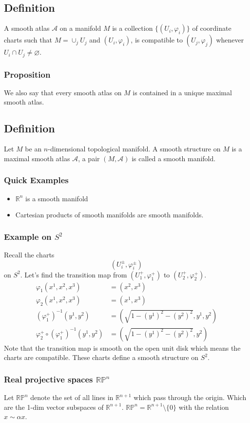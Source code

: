 \documentclass[a4paper]{article}
\begin{document}
\subsection*{Definition} A smooth atlas $\mathcal{A}$ on a manifold $M$ is a collection $\{(U_i, \varphi_i)\}$ of coordinate charts such that $M = \cup_j U_j$ and $(U_i, \varphi_i)$, is compatible to $(U_j, \varphi_j)$ whenever $U_i \cap U_j \neq \varnothing$. 
\subsubsection*{Proposition}
We also say that every smooth atlas on $M$ is contained in a unique maximal smooth atlas. 

\subsection*{Definition} Let $M$ be an $n$-dimensional topological manifold. A smooth structure on $M$ is a maximal smooth atlas $\mathcal{A}$, a pair $(M, \mathcal{A})$ is called a smooth manifold.
 
\subsubsection*{Quick Examples}
\begin{itemize}
    \item $\mathds{R}^n$ is a smooth manifold
    \item Cartesian products of smooth manifolds are smooth manifolds.
\end{itemize}

\subsubsection*{Example on $S^2$}
Recall the charts
\[
    (U_i^\pm, \varphi_i^\pm)
\]
on $S^2$. Let's find the transition map from $(U_1^+, \varphi_1^+)$ to $(U_2^+, \varphi_2^+)$.
\[
    \begin{aligned}
        \varphi_1(x^1,x^2,x^3) &= (x^2, x^3) \\
        \varphi_2(x^1,x^2,x^3) &= (x^1, x^3) \\
        (\varphi_1^+)^{-1}(y^1, y^2) &= (\sqrt{1 - (y^1)^2 - (y^2)^2}, y^1, y^2) \\
        \varphi_2^+ \circ (\varphi_1^+)^{-1}(y^1, y^2) &= (\sqrt{1 - (y^1)^2 - (y^2)^2}, y^2)
    \end{aligned}
\]
Note that the transition map is smooth on the open unit disk which means the charts are compatible. These charts define a smooth structure on $S^2$.

\subsubsection*{Real projective spaces $\mathds{RP}^n$}
Let $\mathds{RP}^n$ denote the set of all lines in $\mathds{R}^{n+1}$ which pass through the origin. Which are the 1-dim vector subspaces of $\mathds{R}^{n+1}$. $\mathds{RP}^n = \mathds{R}^{n+1} \setminus \{0\}$ with the relation $x \sim \alpha x$.
\end{document}
